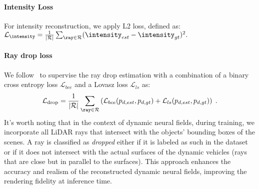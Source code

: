 \paragraph{Intensity Loss}
For intensity reconstruction, we apply L2 loss, defined as: $\mathcal{L}_{\intensity} = \frac{1}{|\mathcal{R}|}\sum_{\ray \in \mathcal{R}}(\intensity_{est} -\intensity_{gt})^2.$


\paragraph{Ray drop loss}
We follow~\cite{Huang2023nfl} to supervise the ray drop estimation with a combination of a binary cross entropy loss $\mathcal{L}_{bce}$ and a Lovasz loss $\mathcal{L}_{ls}$ \cite{berman2018lovasz} as:
\begin{equation}
     \mathcal{L}_{\text{drop}} = \frac{1}{|\mathcal{R}|} \sum_{\ray \in \mathcal{R}} \left(\mathcal{L}_{bce}(p_{d, est}, {p_{d, gt}}) + \mathcal{L}_{ls}(p_{d, est}, {p_{d, gt}}) \right)\;.
     \label{eq:raydrop_loss}
\end{equation}
It's worth noting that in the context of dynamic neural fields, during training, we incorporate all LiDAR rays that intersect with the objects' bounding boxes of the scenes. A ray is classified as \textit{dropped} either if it is labeled as such in the dataset or if it does not intersect with the actual surfaces of the dynamic vehicles (\eg rays that are close but in parallel to the surfaces). This approach enhances the accuracy and realism of the reconstructed dynamic neural fields, improving the rendering fidelity at inference time. 
